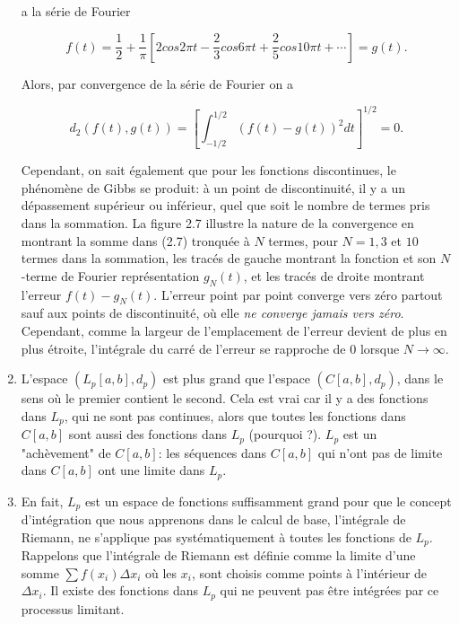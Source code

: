 \documentclass[11pt,twoside,a4paper]{article}
\begin{document}
\begin{enumerate}


  \noindent
  a la série de Fourier

  \begin{equation}
    f(t) = \frac{1}{2} + \frac{1}{\pi}  \left[2cos2\pi t - \frac{2}{3}cos6\pi t + \frac{2}{5}cos10\pi t + \cdots \right] = g(t).
  \end{equation}

  \noindent
  Alors, par convergence de la série de Fourier on a

  \begin{equation*}
    d_2(f(t), g(t)) = \left[ \int_{-1/2}^{1/2} (f(t) - g(t))^2dt \right]^{1/2} = 0.
  \end{equation*}

  \noindent
  Cependant, on sait également que pour les fonctions discontinues, le phénomène de Gibbs se produit: à un point de discontinuité, il y a un dépassement supérieur ou inférieur, quel que soit le nombre de termes pris dans la sommation. 
  La figure 2.7 illustre la nature de la convergence en montrant la somme dans (2.7) tronquée à $N$ termes, pour $N = 1, 3$ et $10$ termes dans la sommation, les tracés de gauche montrant la fonction et son $N$-terme de Fourier représentation $g_N(t)$, 
  et les tracés de droite montrant l'erreur $f(t) - g_N(t)$. L'erreur point par point converge vers zéro partout sauf aux points de discontinuité, où elle \textit{ne converge jamais vers zéro}. 
  Cependant, comme la largeur de l'emplacement de l'erreur devient de plus en plus étroite, l'intégrale du carré de l'erreur se rapproche de 0 lorsque $N \longrightarrow \infty$.

  \item L'espace $(L_p[a, b], d_p)$ est plus grand que l'espace $(C[a, b], d_p)$, dans le sens où le premier contient le second. Cela est vrai car il y a des fonctions dans $L_p$, qui ne sont pas continues, alors que toutes les fonctions dans $C[a, b]$ sont aussi des fonctions dans $L_p$ (pourquoi ?). 
  $L_p$ est un "achèvement" de $C[a, b]$: les séquences dans $C[a, b]$ qui n'ont pas de limite dans $C[a, b]$ ont une limite dans $L_p$.

  \item En fait, $L_p$ est un espace de fonctions suffisamment grand pour que le concept d'intégration que nous apprenons dans le calcul de base, l'intégrale de Riemann, ne s'applique pas systématiquement à toutes les fonctions de $L_p$. Rappelons que l'intégrale de Riemann est définie comme la limite d'une somme 
  $\sum f(x_i) \Delta x_i$ où les $x_i$, sont choisis comme points à l'intérieur de $\Delta x_i$. Il existe des fonctions dans $L_p$ qui ne peuvent pas être intégrées par ce processus limitant.
  \vspace{4mm}


\end{enumerate}
\end{document}
